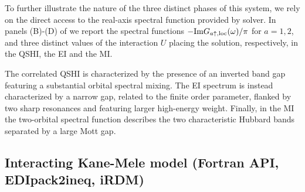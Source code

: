 \documentclass[edipack_sp.tex]{subfiles}
\begin{document}
To further illustrate the nature of the three distinct phases of this
system, we rely on the direct access to the real-axis spectral
function provided by \NAME solver. In panels (B)-(D) of 
we report the spectral functions $-{\rm Im}{G}_{a\uparrow,\mathrm{loc}}(\omega)/\pi$ for
$a=1,2$, and three distinct values of the interaction
$U$ placing the solution, respectively, in the QSHI, the EI and the MI.

The correlated QSHI is characterized by the presence of an 
inverted band gap featuring a substantial orbital spectral mixing. The
EI spectrum is instead characterized by a narrow gap, related to the
finite order parameter, flanked by two sharp resonances and featuring
larger high-energy weight.
Finally, in the MI the two-orbital spectral function describes the two 
characteristic Hubbard bands separated by a large Mott gap.  








\subsection{Interacting Kane-Mele model (Fortran API, EDIpack2ineq, iRDM)}
\end{document}
